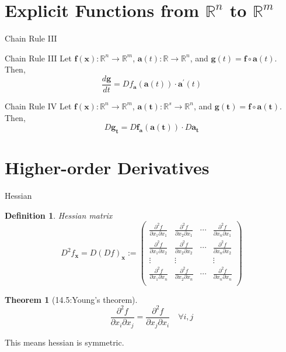 \documentclass[final]{beamer}
\newtheorem{defn}{Definition}
\newtheorem{thm}{Theorem}
\newcommand{\bb}{\mathbb}
\newcommand{\bd}{\mathbf}
\newcommand{\p}{\partial}
\begin{document}
\section{Explicit Functions from $\mathbb{R}^n$ to $\mathbb{R}^m$} %
\label{sec:explicit_functions_from_mathbb_r_n_to_mathbb_r_m}
\begin{frame}[t]{Chain Rule III}
	\begin{block}
		{Chain Rule III}
		Let $\bd f(\bd x): \bb{R}^n\rightarrow \bb{R}^m$, $\bd a(t):\bb{R}\rightarrow\bb{R}^n$, and $\bd g(t) = \bd f \circ \bd a (t)$. Then, \[
			\frac{d\bd g}{dt} = Df_{\bd a}(\bd a(t))\cdot \bd a^\prime (t)
		\]
	\end{block}
	\begin{block}
		{Chain Rule IV}
		Let $\bd f(\bd x): \bb{R}^n\rightarrow \bb{R}^m$, $\bd a(\bd t ):\bb{R}^s\rightarrow\bb{R}^n$, and $\bd g(\bd t) = \bd f \circ \bd a (\bd t)$. Then, \[
			{D\bd g}_{\bd t} = {D\bd f}_{\bd a} (\bd a(\bd t))\cdot D\bd a_{\bd t}
		\]
	\end{block}
\end{frame}
\section{Higher-order Derivatives} %
\label{sec:higher_order_derivatives}
\begin{frame}[t]{Hessian}
	\begin{defn}
		{Hessian matrix}\[
			D^2 f_{\bd x} = D(Df)_{\bd x}:=\begin{pmatrix}
				\frac{\p^2 f}{\p x_1 \p x_1} & \frac{\p^2 f}{\p x_2\p x_1} & \cdots & \frac{\p^2 f}{\p x_n \p x_1}\\
				\frac{\p^2 f}{\p x_1 \p x_2} & \frac{\p^2 f}{\p x_2\p x_2} & \cdots & \frac{\p^2 f}{\p x_n \p x_2}\\
				\vdots & \vdots & &\vdots\\
				\frac{\p^2 f}{\p x_1 \p x_n} & \frac{\p^2 f}{\p x_2\p x_n} & \cdots & \frac{\p^2 f}{\p x_n \p x_n}\\
			\end{pmatrix}
		\]
	\end{defn}
	\begin{thm}
		[14.5:Young's theorem]
		\[
			 \frac{\p^2 f}{\p x_i\p x_j} =  \frac{\p^2 f}{\p x_j\p x_i} \quad\forall i,j
		\]
	\end{thm}
	This means hessian is symmetric.
\end{frame}
\end{document}
